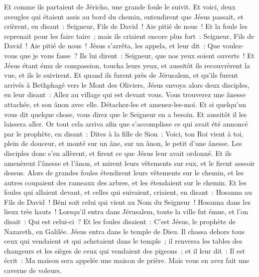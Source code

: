 \begin{multicols}{2}
Et comme ils partaient de Jéricho, une grande foule le suivit.
Et voici, deux aveugles qui étaient assis au bord du chemin, entendirent que Jésus passait, et crièrent, en disant~: Seigneur, Fils de David~! Aie pitié de nous~!
Et la foule les reprenait pour les faire taire~; mais ils criaient encore plus fort~: Seigneur, Fils de David~! Aie pitié de nous~!
Jésus s'arrêta, les appela, et leur dit~: Que voulez-vous que je vous fasse~?
Ils lui dirent~: Seigneur, que nos yeux soient ouverts~!
Et Jésus étant ému de compassion, toucha leurs yeux, et aussitôt ils recouvrèrent la vue, et ils le suivirent.
\VerseOne{}Et quand ils furent près de Jérusalem, et qu'ils furent arrivés à Bethphagé vers le Mont des Oliviers, Jésus envoya alors deux disciples,
en leur disant~: Allez au village qui est devant vous. Vous trouverez une ânesse attachée, et son ânon avec elle. Détachez-les et amenez-les-moi.
Et si quelqu'un vous dit quelque chose, vous direz que le Seigneur en a besoin. Et aussitôt il les laissera aller.
Or tout cela arriva afin que s'accomplisse ce qui avait été annoncé par le prophète, en disant~:
Dites à la fille de Sion~: Voici, ton Roi vient à toi, plein de douceur, et monté sur un âne, sur un ânon, le petit d'une ânesse.
Les disciples donc s'en allèrent, et firent ce que Jésus leur avait ordonné.
Et ils amenèrent l'ânesse et l'ânon, et mirent leurs vêtements sur eux, et le firent asseoir dessus.
Alors de grandes foules étendirent leurs vêtements sur le chemin, et les autres coupaient des rameaux des arbres, et les étendaient sur le chemin.
Et les foules qui allaient devant, et celles qui suivaient, criaient, en disant~: Hosanna au Fils de David~! Béni soit celui qui vient au Nom du Seigneur~! Hosanna dans les lieux très hauts~!
Lorsqu'il entra dans Jérusalem, toute la ville fut émue, et l'on disait~: Qui est celui-ci~?
Et les foules disaient~: C'est Jésus, le prophète de Nazareth, en Galilée.
Jésus entra dans le temple de Dieu. Il chassa dehors tous ceux qui vendaient et qui achetaient dans le temple~; il renversa les tables des changeurs et les sièges de ceux qui vendaient des pigeons~;
et il leur dit~: Il est écrit~: Ma maison sera appelée une maison de prière. Mais vous en avez fait une caverne de voleurs.

\end{multicols}
